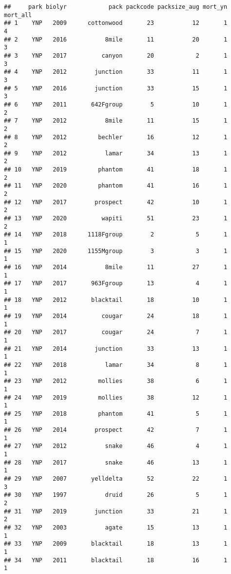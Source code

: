 \documentclass[
]{article}
\begin{document}
\begin{verbatim}
##     park biolyr            pack packcode packsize_aug mort_yn mort_all
## 1    YNP   2009      cottonwood       23           12       1        4
## 2    YNP   2016           8mile       11           20       1        3
## 3    YNP   2017          canyon       20            2       1        3
## 4    YNP   2012        junction       33           11       1        3
## 5    YNP   2016        junction       33           15       1        3
## 6    YNP   2011       642Fgroup        5           10       1        2
## 7    YNP   2012           8mile       11           15       1        2
## 8    YNP   2012         bechler       16           12       1        2
## 9    YNP   2012           lamar       34           13       1        2
## 10   YNP   2019         phantom       41           18       1        2
## 11   YNP   2020         phantom       41           16       1        2
## 12   YNP   2017        prospect       42           10       1        2
## 13   YNP   2020          wapiti       51           23       1        2
## 14   YNP   2018      1118Fgroup        2            5       1        1
## 15   YNP   2020      1155Mgroup        3            3       1        1
## 16   YNP   2014           8mile       11           27       1        1
## 17   YNP   2017       963Fgroup       13            4       1        1
## 18   YNP   2012       blacktail       18           10       1        1
## 19   YNP   2014          cougar       24           18       1        1
## 20   YNP   2017          cougar       24            7       1        1
## 21   YNP   2014        junction       33           13       1        1
## 22   YNP   2018           lamar       34            8       1        1
## 23   YNP   2012         mollies       38            6       1        1
## 24   YNP   2019         mollies       38           12       1        1
## 25   YNP   2018         phantom       41            5       1        1
## 26   YNP   2014        prospect       42            7       1        1
## 27   YNP   2012           snake       46            4       1        1
## 28   YNP   2017           snake       46           13       1        1
## 29   YNP   2007       yelldelta       52           22       1        3
## 30   YNP   1997           druid       26            5       1        2
## 31   YNP   2019        junction       33           21       1        2
## 32   YNP   2003           agate       15           13       1        1
## 33   YNP   2009       blacktail       18           13       1        1
## 34   YNP   2011       blacktail       18           16       1        1

\end{verbatim}
\end{document}
